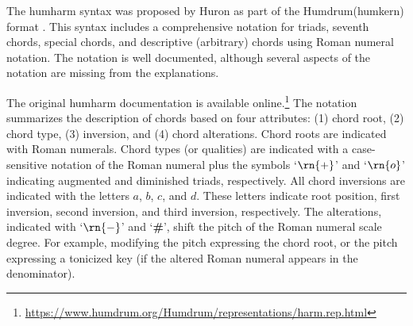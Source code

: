 

The \gls{humharm} syntax was proposed by Huron as part of
the Humdrum(\gls{humkern}) format
\parencite{huron1994humdrum}. This syntax includes a
comprehensive notation for triads, seventh chords, special
chords, and descriptive (arbitrary) chords using Roman
numeral notation. The notation is well documented, although
several aspects of the notation are missing from the
explanations.

The original \gls{humharm} documentation is available
online.\footnote{\href{https://www.humdrum.org/Humdrum/representations/harm.rep.html}{https://www.humdrum.org/Humdrum/representations/harm.rep.html}}
The notation summarizes the description of chords based on
four attributes: (1) chord root, (2) chord type, (3)
inversion, and (4) chord alterations. Chord roots are
indicated with Roman numerals. Chord types (or qualities)
are indicated with a case-sensitive notation of the Roman
numeral plus the symbols `$\rn{+}$' and `$\rn{o}$'
indicating augmented and diminished triads, respectively.
All chord inversions are indicated with the letters $a$,
$b$, $c$, and $d$. These letters indicate root position,
first inversion, second inversion, and third inversion,
respectively. The alterations, indicated with `$\rn{-}$' and
`\textbf{\#}', shift the pitch of the Roman numeral scale
degree. For example, modifying the pitch expressing the
chord root, or the pitch expressing a tonicized key (if the
altered Roman numeral appears in the denominator).
